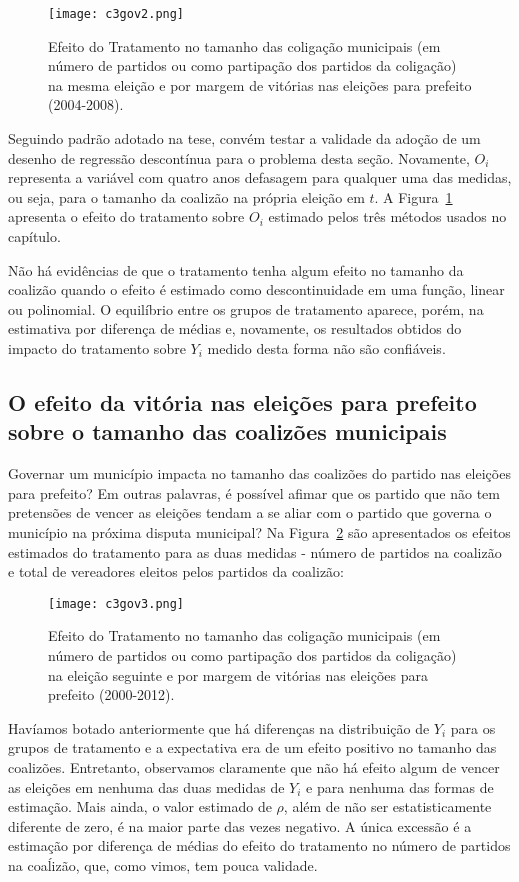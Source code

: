 \begin{figure}[htp]
	\centering
	\texttt{[image: c3gov2.png]}
	\caption{Efeito do Tratamento no tamanho das coligação municipais (em número de partidos ou como partipação dos partidos da coligação) na mesma eleição e por margem de vitórias nas eleições para prefeito (2004-2008).}
	\label{fig:c3gov2}
\end{figure}

Seguindo padrão adotado na tese, convém testar a validade da adoção de um desenho de regressão descontínua para o problema desta seção. Novamente, $O_{i}$ representa a variável com quatro anos defasagem para qualquer uma das medidas, ou seja, para o tamanho da coalizão na própria eleição em $t$. A Figura~\ref{fig:c3gov2} apresenta o efeito do tratamento sobre $O_{i}$ estimado pelos três métodos usados no capítulo. 

Não há evidências de que o tratamento tenha algum efeito no tamanho da coalizão quando o efeito é estimado como descontinuidade em uma função, linear ou polinomial. O equilíbrio entre os grupos de tratamento aparece, porém, na estimativa por diferença de médias e, novamente, os resultados obtidos do impacto do tratamento sobre $Y_{i}$ medido desta forma não são confiáveis.

\subsection{O efeito da vitória nas eleições para prefeito sobre o tamanho das coalizões municipais}

Governar um município impacta no tamanho das coalizões do partido nas eleições para prefeito? Em outras palavras, é possível afimar que os partido que não tem pretensões de vencer as eleições tendam a se aliar com o partido que governa o município na próxima disputa municipal? Na Figura~\ref{fig:c3gov3} são apresentados os efeitos estimados do tratamento para as duas medidas - número de partidos na coalizão e total de vereadores eleitos pelos partidos da coalizão:

\begin{figure}
	\centering
	\texttt{[image: c3gov3.png]}
	\caption{Efeito do Tratamento no tamanho das coligação municipais (em número de partidos ou como partipação dos partidos da coligação) na eleição seguinte e por margem de vitórias nas eleições para prefeito (2000-2012).}
	\label{fig:c3gov3}
\end{figure}

Havíamos botado anteriormente que há diferenças na distribuição de $Y_{i}$ para os grupos de tratamento e a expectativa era de um efeito positivo no tamanho das coalizões. Entretanto, observamos claramente que não há efeito algum de vencer as eleições em nenhuma das duas medidas de $Y_{i}$ e para nenhuma das formas de estimação. Mais ainda, o valor estimado de $\rho$, além de não ser estatisticamente diferente de zero, é na maior parte das vezes negativo. A única excessão é a estimação por diferença de médias do efeito do tratamento no número de partidos na coaĺizão, que, como vimos, tem pouca validade.

